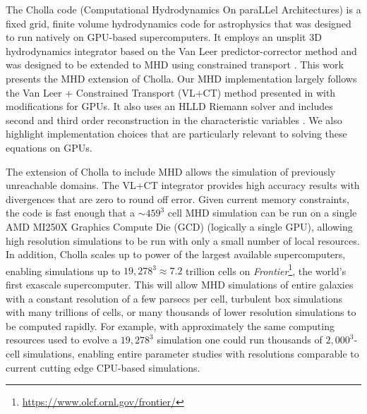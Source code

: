 \documentclass[modern, linenumbers]{aastex631}
\begin{document}
The Cholla code (Computational Hydrodynamics On paraLLel Architectures) \citep{schneider_2015} is a fixed grid, finite volume hydrodynamics code for astrophysics that was designed to run natively on GPU-based supercomputers. It employs an unsplit 3D hydrodynamics integrator based on the Van Leer predictor-corrector method \citep{falle_1991, van_leer_2006} and was designed to be extended to MHD using constrained transport \citep{evans_1988}. This work presents the MHD extension of Cholla. Our MHD implementation largely follows the Van Leer + Constrained Transport (VL+CT) method presented in \cite{stone_2009} with modifications for GPUs. It also uses an HLLD Riemann solver \citep{hlld_2005} and includes second \citep{stone_2009} and third \citep{felker_2018} order reconstruction in the characteristic variables \citep{stone_athena_2008}. We also highlight implementation choices that are particularly relevant to solving these equations on GPUs.

The extension of Cholla to include MHD allows the simulation of previously unreachable domains. The VL+CT integrator provides high accuracy results with divergences that are zero to round off error. Given current memory constraints, the code is fast enough that a $\sim459^3$ cell MHD simulation can be run on a single AMD MI250X Graphics Compute Die (GCD) (logically a single GPU), allowing high resolution simulations to be run with only a small number of local resources. In addition, Cholla scales up to power of the largest available supercomputers, enabling simulations up to $19,278^3 \approx 7.2$ trillion cells on \textit{Frontier}\footnote{\url{https://www.olcf.ornl.gov/frontier/}}, the world's first exascale supercomputer. This will allow MHD simulations of entire galaxies with a constant resolution of a few parsecs per cell, turbulent box simulations with many trillions of cells, or many thousands of lower resolution simulations to be computed rapidly. For example, with approximately the same computing resources used to evolve a $19,278^3$ simulation one could run thousands of $2,000^3$-cell simulations, enabling entire parameter studies with resolutions comparable to current cutting edge CPU-based simulations.
\end{document}
